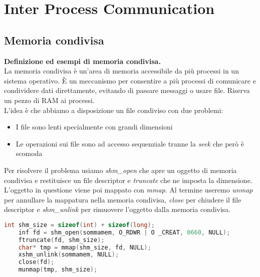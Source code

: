 \newpage
\section{Inter Process Communication}

\subsection{Memoria condivisa}
\textbf{Definizione ed esempi di memoria condivisa.}\\
La memoria condivisa è un'area di memoria accessibile da più processi in un sistema operativo. È un meccanismo per consentire a più processi di comunicare e condividere dati direttamente, evitando di passare messaggi o usare file. Riserva un pezzo di RAM ai processi.\\
L'idea è che abbiamo a disposizione un file condiviso con due problemi:
\begin{itemize}
	\item I file sono lenti specialmente con grandi dimensioni
	\item Le operazioni sui file sono ad accesso sequenziale tranne la \textit{seek} che però è scomoda
\end{itemize}
Per risolvere il problema usiamo \textit{shm\_open} che apre un oggetto di memoria condivisa e restituisce un file descriptor e \textit{truncate} che ne imposta la dimensione. L'oggetto in questione viene poi mappato con \textit{mmap}. Al termine useremo \textit{unmap} per annullare la mappatura nella memoria condivisa, \textit{close} per chiudere il file descriptor e \textit{shm\_unlink} per rimuovere l'oggetto dalla memoria condivisa.
\begin{lstlisting}[language=C]
	int shm_size = sizeof(int) + sizeof(long);
	inf fd = shm_open(sommamem, O_RDWR | O _CREAT, 0660, NULL);
	ftruncate(fd, shm_size);
	char* tmp = mmap(shm_size, fd, NULL);
	xshm_unlink(sommamem, NULL);
	close(fd);
	munmap(tmp, shm_size);
\end{lstlisting}

